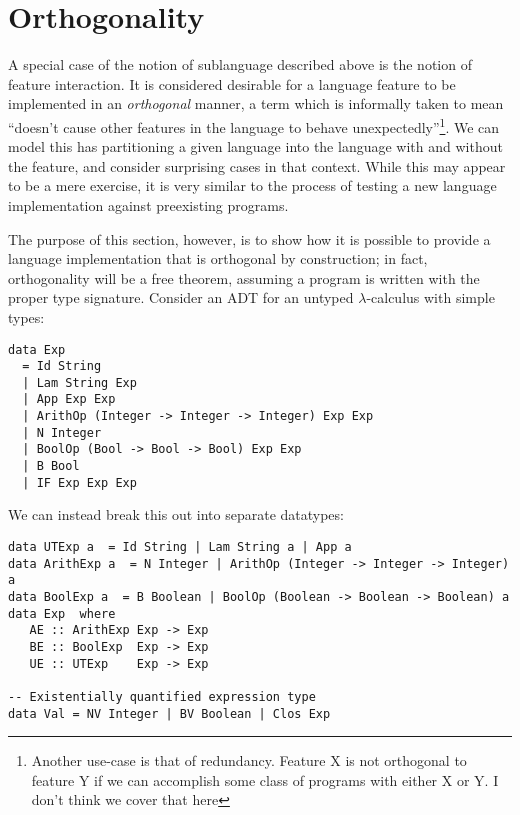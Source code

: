 \documentclass[12pt]{article}
\begin{document}
\section{Orthogonality}

A special case of the notion of sublanguage described above is the notion of
feature interaction. It is considered desirable for a language feature to be
implemented in an \emph{orthogonal} manner, a term which is informally taken to
mean ``doesn't cause other features in the language to behave
unexpectedly''\footnote{Another use-case is that of redundancy. Feature X is not
orthogonal to feature Y if we can accomplish some class of programs with either
X or Y. I don't think we cover that here}. We can model this has partitioning a
given language into the language with and without the feature, and consider
surprising cases in that context. While this may appear to be a mere exercise,
it is very similar to the process of testing a new language implementation
against preexisting programs.

The purpose of this section, however, is to show how it is possible to provide a
language implementation that is orthogonal by construction; in fact,
orthogonality will be a free theorem, assuming a program is written with the
proper type signature. Consider an ADT for an untyped $\lambda$-calculus with
simple types:

\begin{verbatim}
data Exp 
  = Id String 
  | Lam String Exp 
  | App Exp Exp 
  | ArithOp (Integer -> Integer -> Integer) Exp Exp 
  | N Integer
  | BoolOp (Bool -> Bool -> Bool) Exp Exp
  | B Bool
  | IF Exp Exp Exp
\end{verbatim}


We can instead break this out into separate datatypes:

\begin{verbatim}
data UTExp a  = Id String | Lam String a | App a
data ArithExp a  = N Integer | ArithOp (Integer -> Integer -> Integer) a
data BoolExp a  = B Boolean | BoolOp (Boolean -> Boolean -> Boolean) a
data Exp  where
   AE :: ArithExp Exp -> Exp 
   BE :: BoolExp  Exp -> Exp 
   UE :: UTExp    Exp -> Exp 
  
-- Existentially quantified expression type
data Val = NV Integer | BV Boolean | Clos Exp
\end{verbatim}
\end{document}

